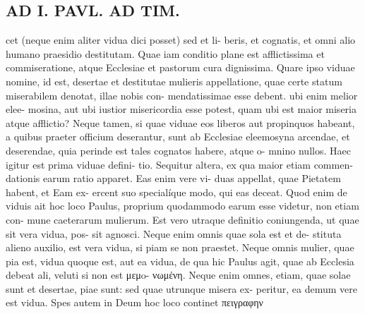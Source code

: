 \documentclass{article}
\begin{document}
\begin{pages}
\section*{AD I. PAVL. AD TIM. }
\marginpar{[ p.258 ]}cet (neque enim aliter vidua dici posset) sed et li- beris, et cognatis, et omni alio humano praesidio destitutam. Quae iam conditio plane est afflictissima et commiseratione, atque Ecclesiae et pastorum cura dignissima. Quare ipso viduae nomine, id est, desertae et destitutae mulieris appellatione, quae certe statum miserabilem denotat, illae nobis con- mendatissimae esse debent. ubi enim melior elee- mosina, aut ubi iustior misericordia esse potest, quam ubi est maior miseria atque afflictio? Neque tamen, si quae viduae eos liberos aut propinquos habeant, a quibus praeter officium deserantur, sunt ab Ecclesiae eleemosyna arcendae, et deserendae, quia perinde est tales cognatos habere, atque o- mnino nullos. Haec igitur est prima viduae defini- tio. Sequitur altera, ex qua maior etiam commen- dationis earum ratio apparet. Eas enim vere vi- duas appellat, quae Pietatem habent, et Eam ex- ercent suo specialíque modo, qui eas deceat. Quod enim de viduis ait hoc loco Paulus, proprium quodammodo earum esse videtur, non etiam con- mune caeterarum mulierum. Est vero utraque definitio coniungenda, ut quae sit vera vidua, pos- sit agnosci. Neque enim omnis quae sola est et de- stituta alieno auxilio, est vera vidua, si piam se non praestet. Neque omnis mulier, quae pia est, vidua quoque est, aut ea vidua, de qua hic Paulus agit, quae ab Ecclesia debeat ali, veluti si non est μεμo- νωμένη. Neque enim omnes, etiam, quae solae sunt et desertae, piae sunt: sed quae utrunque misera ex- peritur, ea demum vere est vidua. Spes autem in Deum hoc loco continet πειγραφην 

\end{pages}
\end{document}

